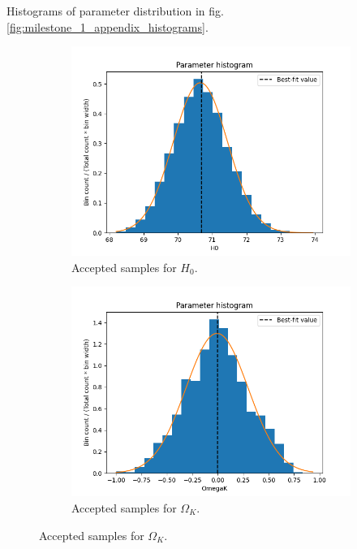 \begin{appendix}
Histograms of parameter distribution in fig. \ref{fig:milestone_1_appendix_histograms}.

\begin{figure}[h!tb]
\centering
    \begin{subfigure}[t!]{0.4\textwidth}
    \centering
    \includegraphics[width=1.0\textwidth]{../Milestone 1/Plots/H0_histogram.png}
    \caption{Accepted samples for $H_0$.}
    \label{fig:milestone_1_H0_histogram}
    \end{subfigure}
    \begin{subfigure}[t!]{0.4\textwidth}
    \centering
    \includegraphics[width=1.0\textwidth]{../Milestone 1/Plots/OmegaK_histogram.png}
    \caption{Accepted samples for $\Omega_K$.}

\end{subfigure}
\end{figure}
\end{appendix}
